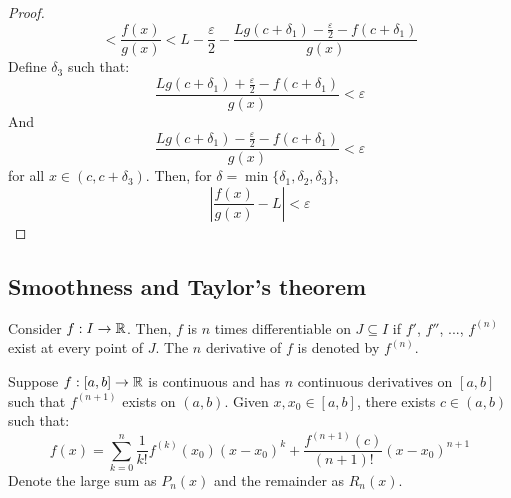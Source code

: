 \begin{proof}
\begin{equation*}
        <
        \frac{f(x)}{g(x)}
        <
        L - \frac{\varepsilon}{2} - \frac{Lg(c+\delta_1) - \frac{\varepsilon}{2} - f(c+\delta_1)}{g(x)}
    \end{equation*}
    Define $\delta_3$ such that:
    \begin{equation*}
        \frac{Lg(c+\delta_1) + \frac{\varepsilon}{2} - f(c+\delta_1)}{g(x)} < \varepsilon
    \end{equation*}
    And
    \begin{equation*}
        \frac{Lg(c+\delta_1) - \frac{\varepsilon}{2} - f(c+\delta_1)}{g(x)} < \varepsilon
    \end{equation*}
    for all $x \in (c, c+ \delta_3)$. Then, for $\delta = \min \{ \delta_1, \delta_2, \delta_3 \}$,
    \begin{equation*}
        \left |
            \frac{f(x)}{g(x)} - L
        \right | < \varepsilon
    \end{equation*}
\end{proof}

\subsection{Smoothness and Taylor's theorem}

\begin{definition}
    Consider $f: I \to \mathbb{R}$. Then, $f$ is $n$ times differentiable on $J \subseteq I$ if $f'$, $f''$, ..., $f^{(n)}$ exist at every point of $J$. The $n$ derivative of $f$ is denoted by $f^(n)$.
\end{definition}

\begin{theorem}
    Suppose $f: [a,b] \to \mathbb{R}$ is continuous and has $n$ continuous derivatives on $[a,b]$ such that $f^{(n+1)}$ exists on $(a,b)$. Given $x, x_0 \in [a,b]$, there exists $c \in (a,b)$ such that:
    \begin{equation}
        f(x) = \sum \limits_{k = 0}^n \frac{1}{k!}f^{(k)}(x_0)(x-x_0)^k + \frac{f^{(n+1)}(c)}{(n+1)!}(x-x_0)^{n+1}
    \end{equation}
    Denote the large sum as $P_n(x)$ and the remainder as $R_n(x)$.
\end{theorem}

